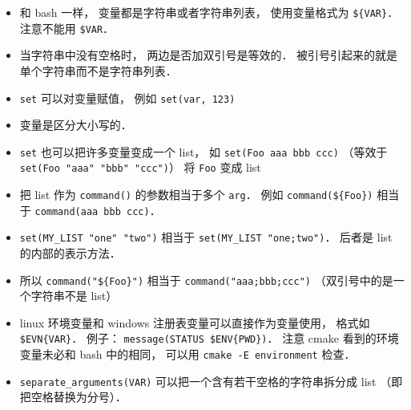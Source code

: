 \begin{itemize}
\item 和 bash 一样， 变量都是字符串或者字符串列表， 使用变量格式为 \verb`${VAR}`． 注意不能用 \verb|$VAR|．
\item 当字符串中没有空格时， 两边是否加双引号是等效的． 被引号引起来的就是单个字符串而不是字符串列表．
\item \verb`set` 可以对变量赋值， 例如 \verb`set(var, 123)`
\item 变量是区分大小写的．
\item \verb`set` 也可以把许多变量变成一个 list， 如 \verb`set(Foo aaa bbb ccc)` （等效于 \verb|set(Foo "aaa" "bbb" "ccc")|） 将 \verb`Foo` 变成 list
\item 把 list 作为 \verb|command()| 的参数相当于多个 \verb|arg|． 例如 \verb`command(${Foo})` 相当于 \verb`command(aaa bbb ccc)`．
\item \verb|set(MY_LIST "one" "two")| 相当于 \verb|set(MY_LIST "one;two")|． 后者是 list 的内部的表示方法．
\item 所以 \verb`command("${Foo}")` 相当于 \verb`command("aaa;bbb;ccc")` （双引号中的是一个字符串不是 list）
\item linux 环境变量和 windows 注册表变量可以直接作为变量使用， 格式如 \verb`$EVN{VAR}`． 例子： \verb|message(STATUS $ENV{PWD})|． 注意 cmake 看到的环境变量未必和 bash 中的相同， 可以用 \verb`cmake -E environment` 检查．
\item \verb|separate_arguments(VAR)| 可以把一个含有若干空格的字符串拆分成 list （即把空格替换为分号）．
\end{itemize}

